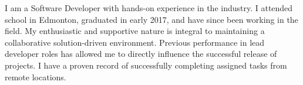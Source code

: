 I am a Software Developer with hands-on experience in the industry. I attended school in Edmonton, graduated in early 2017, and have since been working in the field. My enthusiastic and supportive nature is integral to maintaining a collaborative solution-driven environment. Previous performance in lead developer roles has allowed me to directly influence the successful release of projects. I have a proven record of successfully completing assigned tasks from remote locations.